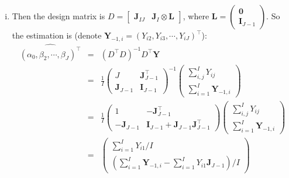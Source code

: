 \documentclass[12pt]{article}
\newcommand{\ttt}[1]{\textbf{#1}}
\begin{document}
\begin{enumerate}
\begin{enumerate}[A.]
\begin{enumerate}[i.]
            \item
            Then the design matrix is $D = \begin{bmatrix} \ttt{J}_{IJ} & \ttt{J}_I \otimes \ttt{L} \end{bmatrix}$, where $\ttt{L} = \begin{pmatrix} \ttt{0} \\ \ttt{I}_{J-1}\end{pmatrix}$.
            So the estimation is (denote $\ttt{Y}_{-1,i} = (Y_{i2},Y_{i3},\cdots,Y_{iJ})^\top$):
            \begin{eqnarray}
                \widehat{(\alpha_0,\beta_2,\cdots,\beta_J)^\top} &=& (D^\top D)^{-1} D^\top \ttt{Y} \\
                                                                 &=& \frac{1}{I} \begin{pmatrix}
                                                                                    J & \ttt{J}_{J-1}^\top \\
                                                                                    \ttt{J}_{J-1} & \ttt{I}_{J-1}
                                                                                 \end{pmatrix}^{-1} \begin{pmatrix} \sum_{i,j}^I Y_{ij} \\ \sum_{i=1}^{I} \ttt{Y}_{-1,i}\end{pmatrix} \\
                                                                 &=& \frac{1}{I} \begin{pmatrix}
                                                                    1 & -\ttt{J}_{J-1}^\top \\
                                                                    -\ttt{J}_{J-1} & \ttt{I}_{J-1} + \ttt{J}_{J-1}\ttt{J}_{J-1}^\top
                                                                 \end{pmatrix} \begin{pmatrix} \sum_{i,j}^I Y_{ij} \\ \sum_{i=1}^{I} \ttt{Y}_{-1,i}\end{pmatrix} \\
                                                                 &=& \begin{pmatrix} \sum_{i=1}^{I} Y_{i1} / I \\ (\sum_{i=1}^{I} \ttt{Y}_{-1,i} - \sum_{i=1}^{I} Y_{i1} \ttt{J}_{J-1}) / I\end{pmatrix}
            \end{eqnarray}


\end{enumerate}
\end{enumerate}
\end{enumerate}
\end{document}
